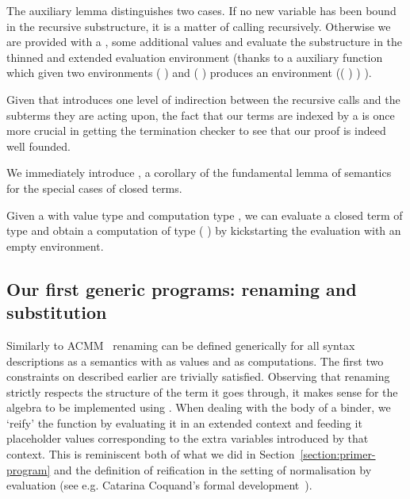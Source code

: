 \begin{center}
\end{center}

The auxiliary lemma  distinguishes two cases. If no new
variable has been bound in the recursive substructure, it is
a matter of calling \semfun{} recursively. Otherwise we are provided
with a , some additional values and evaluate the
substructure in the thinned and extended evaluation environment
(thanks to a auxiliary function \AF{\_>>\_} which given two environments
{( )  } and {( )  }
produces an environment {(( \AF{++} ) )  )}.

\begin{center}
\end{center}

Given that  introduces one level of indirection between the
recursive calls and the subterms they are acting upon, the fact
that our terms are indexed by a  is once more crucial in
getting the termination checker to see that our proof is indeed
well founded.

We immediately introduce , a corollary of the fundamental lemma of
semantics for the special cases of closed terms.
\begin{center}
\end{center}
Given a  with value type  and computation type ,
we can evaluate a closed term of type  and obtain a computation of
type {(  \AIC{[]})} by kickstarting the evaluation with an
empty environment.


\subsection{Our first generic programs: renaming and substitution}%
\label{section:renandsub}

Similarly to ACMM~\citeyear{allais2017type} renaming can be defined generically
for all syntax descriptions as a semantics with  as values and  as
computations. The first two constraints on  described earlier are trivially
satisfied. Observing that renaming strictly respects the structure of the term it
goes through, it makes sense for the algebra to be implemented using .
When dealing with the body of a binder, we `reify' the  function by
evaluating it in an extended context and feeding it placeholder values corresponding to
the extra variables introduced by that context. This is reminiscent both of what we
did in Section~\ref{section:primer-program} and the definition of reification in
the setting of normalisation by evaluation
(see e.g. Catarina Coquand's formal development~\citeyear{coquand2002formalised}).

